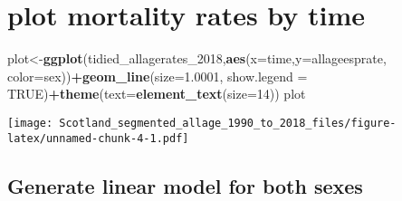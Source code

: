 \documentclass[]{article}
\newenvironment{Shaded}{\begin{snugshade}}{\end{snugshade}}
\newcommand{\KeywordTok}[1]{\textcolor[rgb]{0.13,0.29,0.53}{\textbf{#1}}}
\newcommand{\DataTypeTok}[1]{\textcolor[rgb]{0.13,0.29,0.53}{#1}}
\newcommand{\DecValTok}[1]{\textcolor[rgb]{0.00,0.00,0.81}{#1}}
\newcommand{\FloatTok}[1]{\textcolor[rgb]{0.00,0.00,0.81}{#1}}
\newcommand{\StringTok}[1]{\textcolor[rgb]{0.31,0.60,0.02}{#1}}
\newcommand{\OtherTok}[1]{\textcolor[rgb]{0.56,0.35,0.01}{#1}}
\newcommand{\OperatorTok}[1]{\textcolor[rgb]{0.81,0.36,0.00}{\textbf{#1}}}
\newcommand{\NormalTok}[1]{#1}
\begin{document}
\section{plot mortality rates by
time}\label{plot-mortality-rates-by-time}

\begin{Shaded}
\begin{Highlighting}[]
\NormalTok{plot<-}\KeywordTok{ggplot}\NormalTok{(tidied_allagerates_}\DecValTok{2018}\NormalTok{,}\KeywordTok{aes}\NormalTok{(}\DataTypeTok{x=}\NormalTok{time,}\DataTypeTok{y=}\NormalTok{allageesprate, }\DataTypeTok{color=}\NormalTok{sex))}\OperatorTok{+}\KeywordTok{geom_line}\NormalTok{(}\DataTypeTok{size=}\FloatTok{1.0001}\NormalTok{, }\DataTypeTok{show.legend =} \OtherTok{TRUE}\NormalTok{)}\OperatorTok{+}\KeywordTok{theme}\NormalTok{(}\DataTypeTok{text=}\KeywordTok{element_text}\NormalTok{(}\DataTypeTok{size=}\DecValTok{14}\NormalTok{))}
\NormalTok{plot}
\end{Highlighting}
\end{Shaded}

\texttt{[image: Scotland\_segmented\_allage\_1990\_to\_2018\_files/figure-latex/unnamed-chunk-4-1.pdf]}

\subsection{Generate linear model for both
sexes}\label{generate-linear-model-for-both-sexes}

\begin{Shaded}
\end{Shaded}
\end{document}
